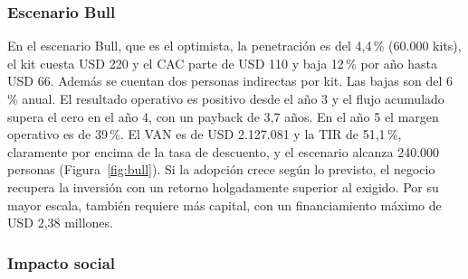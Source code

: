 

\FloatBarrier
\subsubsection{Escenario Bull}

En el escenario Bull, que es el optimista, la penetración es del 4,4\,\% (60.000 kits), el kit cuesta USD 220 y el CAC parte de USD 110 y baja 12\,\% por año hasta USD 66.
Además se cuentan dos personas indirectas por kit.
Las bajas son del 6\,\% anual.
El resultado operativo es positivo desde el año 3 y el flujo acumulado supera el cero en el año 4, con un payback de 3,7 años.
En el año 5 el margen operativo es de 39\,\%.
El VAN es de USD 2.127.081 y la TIR de 51,1\,\%, claramente por encima de la tasa de descuento, y el escenario alcanza 240.000 personas (Figura~\ref{fig:bull}).
Si la adopción crece según lo previsto, el negocio recupera la inversión con un retorno holgadamente superior al exigido.
Por su mayor escala, también requiere más capital, con un financiamiento máximo de USD 2,38 millones.


\FloatBarrier
\subsubsection{Impacto social}


